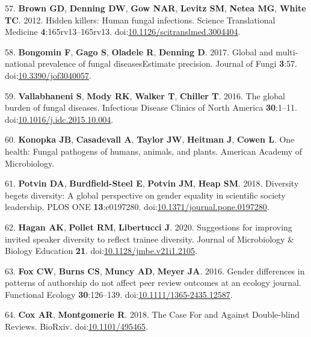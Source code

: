\documentclass[11pt,]{article}
\begin{document}
\hypertarget{ref-Brown2012}{}
57. \textbf{Brown GD}, \textbf{Denning DW}, \textbf{Gow NAR},
\textbf{Levitz SM}, \textbf{Netea MG}, \textbf{White TC}. 2012. Hidden
killers: Human fungal infections. Science Translational Medicine
\textbf{4}:165rv13--165rv13.
doi:\href{https://doi.org/10.1126/scitranslmed.3004404}{10.1126/scitranslmed.3004404}.

\hypertarget{ref-Bongomin2017}{}
58. \textbf{Bongomin F}, \textbf{Gago S}, \textbf{Oladele R},
\textbf{Denning D}. 2017. Global and multi-national prevalence of fungal
diseasesEstimate precision. Journal of Fungi \textbf{3}:57.
doi:\href{https://doi.org/10.3390/jof3040057}{10.3390/jof3040057}.

\hypertarget{ref-Vallabhaneni2016}{}
59. \textbf{Vallabhaneni S}, \textbf{Mody RK}, \textbf{Walker T},
\textbf{Chiller T}. 2016. The global burden of fungal diseases.
Infectious Disease Clinics of North America \textbf{30}:1--11.
doi:\href{https://doi.org/10.1016/j.idc.2015.10.004}{10.1016/j.idc.2015.10.004}.

\hypertarget{ref-ASM_2019}{}
60. \textbf{Konopka JB}, \textbf{Casadevall A}, \textbf{Taylor JW},
\textbf{Heitman J}, \textbf{Cowen L}. One health: Fungal pathogens of
humans, animals, and plants. American Academy of Microbiology.

\hypertarget{ref-potvin_diversity_2018}{}
61. \textbf{Potvin DA}, \textbf{Burdfield-Steel E}, \textbf{Potvin JM},
\textbf{Heap SM}. 2018. Diversity begets diversity: A global perspective
on gender equality in scientific society leadership. PLOS ONE
\textbf{13}:e0197280.
doi:\href{https://doi.org/10.1371/journal.pone.0197280}{10.1371/journal.pone.0197280}.

\hypertarget{ref-Hagan2020}{}
62. \textbf{Hagan AK}, \textbf{Pollet RM}, \textbf{Libertucci J}. 2020.
Suggestions for improving invited speaker diversity to reflect trainee
diversity. Journal of Microbiology \& Biology Education \textbf{21}.
doi:\href{https://doi.org/10.1128/jmbe.v21i1.2105}{10.1128/jmbe.v21i1.2105}.

\hypertarget{ref-fox_gender_2016}{}
63. \textbf{Fox CW}, \textbf{Burns CS}, \textbf{Muncy AD}, \textbf{Meyer
JA}. 2016. Gender differences in patterns of authorship do not affect
peer review outcomes at an ecology journal. Functional Ecology
\textbf{30}:126--139.
doi:\href{https://doi.org/10.1111/1365-2435.12587}{10.1111/1365-2435.12587}.

\hypertarget{ref-cox_case_2018}{}
64. \textbf{Cox AR}, \textbf{Montgomerie R}. 2018. The Case For and
Against Double-blind Reviews. BioRxiv.
doi:\href{https://doi.org/10.1101/495465}{10.1101/495465}.
\end{document}

